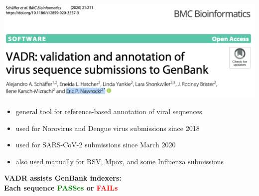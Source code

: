 \documentclass[landscape]{slides}
\begin{document}
\begin{slide}
\begin{center}
\includegraphics[width=10in]{figs/vadr-title-paper}

\begin{itemize}
\item general tool for reference-based annotation of viral sequences
\item used for Norovirus and Dengue virus submissions since 2018
\item used for SARS-CoV-2 submissions since March 2020 
\item also used manually for RSV, Mpox, and some Influenza submissions
\end{itemize}

\vfill
\end{center}
\end{slide}
\begin{slide}
\begin{center}
\large{\textbf{VADR assists GenBank indexers: \\ Each sequence \textcolor{green}{PASSes} or \textcolor{red}{FAILs}}}
\end{center}


\vfill
\end{slide}
\end{document}
